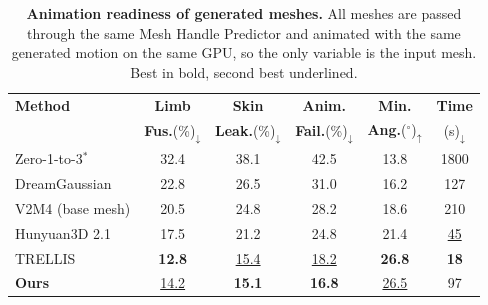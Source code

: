 \documentclass[lettersize,journal]{IEEEtran}
\newcommand{\blu}[1]{\texorpdfstring{{\leavevmode\color{blue}#1}}{#1}}
\begin{document}
\begin{table}[t]
  \centering
  \setlength{\abovecaptionskip}{0.5mm}
  \setlength{\belowcaptionskip}{0mm}
  \renewcommand{\arraystretch}{1.3}
  \scriptsize
  \caption{\blu{\textbf{Animation readiness of generated meshes.} All meshes are
  passed through the same Mesh Handle Predictor and animated with the same generated motion
  on the same GPU, so the only variable is the input mesh. Best in bold, second best
  underlined.}}
  \label{table:readiness}
  \setlength{\tabcolsep}{0pt}
  \begin{tabular*}{\linewidth}{@{\extracolsep{\fill}}lccccc@{}}
    \toprule[1.5pt]
    \blu{\textbf{Method}} & \blu{\textbf{Limb}} & \blu{\textbf{Skin}} & \blu{\textbf{Anim.}} & \blu{\textbf{Min.}}
                    & \blu{\textbf{Time}} \\
                    & \blu{\textbf{Fus.}(\%)$_{\downarrow}$} & \blu{\textbf{Leak.}(\%)$_{\downarrow}$}
                    & \blu{\textbf{Fail.}(\%)$_{\downarrow}$} & \blu{\textbf{Ang.}($^{\circ}$)$_{\uparrow}$}
                    & \blu{(s)$_{\downarrow}$} \\
    \midrule[0.5pt]
    \blu{Zero-1-to-3$^{*}$} & \blu{32.4} & \blu{38.1} & \blu{42.5} & \blu{13.8} & \blu{1800} \\
    \blu{DreamGaussian}     & \blu{22.8} & \blu{26.5} & \blu{31.0} & \blu{16.2} & \blu{127} \\
    \blu{V2M4 (base mesh)}  & \blu{20.5} & \blu{24.8} & \blu{28.2} & \blu{18.6} & \blu{210} \\
    \blu{Hunyuan3D 2.1}     & \blu{17.5} & \blu{21.2} & \blu{24.8} & \blu{21.4} & \blu{\underline{45}} \\
    \blu{TRELLIS}           & \blu{\textbf{12.8}} & \blu{\underline{15.4}} & \blu{\underline{18.2}}
                      & \blu{\textbf{26.8}} & \blu{\textbf{18}} \\
    \midrule[0.5pt]
    \blu{\textbf{Ours}}     & \blu{\underline{14.2}} & \blu{\textbf{15.1}} & \blu{\textbf{16.8}}
                      & \blu{\underline{26.5}} & \blu{97} \\
    \bottomrule[1.5pt]
  \end{tabular*}
\end{table}
\end{document}
